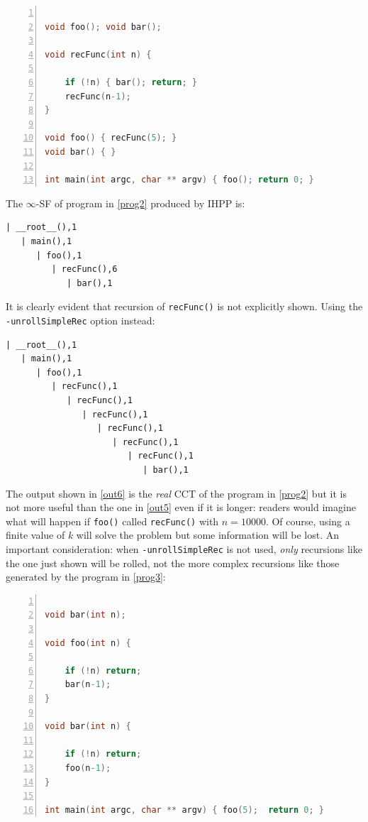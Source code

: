 \documentclass[a4paper,10pt]{report}
\begin{document}
\begin{lstlisting}[language=C, 
	caption={prog2.c, a simple program that uses recursion}, 
	label=prog2, frame=leftline, numbers=left]

void foo(); void bar();

void recFunc(int n) {

	if (!n) { bar(); return; }
	recFunc(n-1);
}

void foo() { recFunc(5); }
void bar() { }

int main(int argc, char ** argv) { foo(); return 0; }

\end{lstlisting}

\noindent
The $\infty$-SF of program in \cref{prog2} produced by IHPP is:

\begin{lstlisting}[label=out5, caption={an example of $k$-SF \emph{without} the \texttt{unrollSimpleRec} option}, frame=bottomline]
| __root__(),1
   | main(),1
      | foo(),1
         | recFunc(),6
            | bar(),1
\end{lstlisting}

\noindent
It is clearly evident that recursion of \verb|recFunc()| is not explicitly shown.
Using the \verb|-unrollSimpleRec| option instead:
\begin{lstlisting}[label=out6, caption={an example of $k$-SF \emph{with} the \texttt{unrollSimpleRec} option}, frame=bottomline]
| __root__(),1
   | main(),1
      | foo(),1
         | recFunc(),1
            | recFunc(),1
               | recFunc(),1
                  | recFunc(),1
                     | recFunc(),1
                        | recFunc(),1
                           | bar(),1
\end{lstlisting}

\noindent
The output shown in \cref{out6} is the \emph{real} CCT of the program in \cref{prog2} 
but it is not more useful than the one in \cref{out5} even if it is longer: readers
would imagine what will happen if \verb|foo()| called \verb|recFunc()| with $n=10000$. 
Of course, using a finite value of $k$ will solve the problem but some information will be lost. An important consideration: when \verb|-unrollSimpleRec| is not used, \emph{only} 
recursions like the one just shown will be rolled, not the more complex recursions like 
those generated by the program in \cref{prog3}:

\begin{lstlisting}[language=C, 
	caption={prog3.c, a program that uses complex recursions}, label=prog3, 
	frame=leftline, numbers=left]

void bar(int n);

void foo(int n) {
	
	if (!n) return;
	bar(n-1);
}

void bar(int n) {

	if (!n) return;
	foo(n-1);
}

int main(int argc, char ** argv) { foo(5);	return 0; }

\end{lstlisting}
\end{document}
